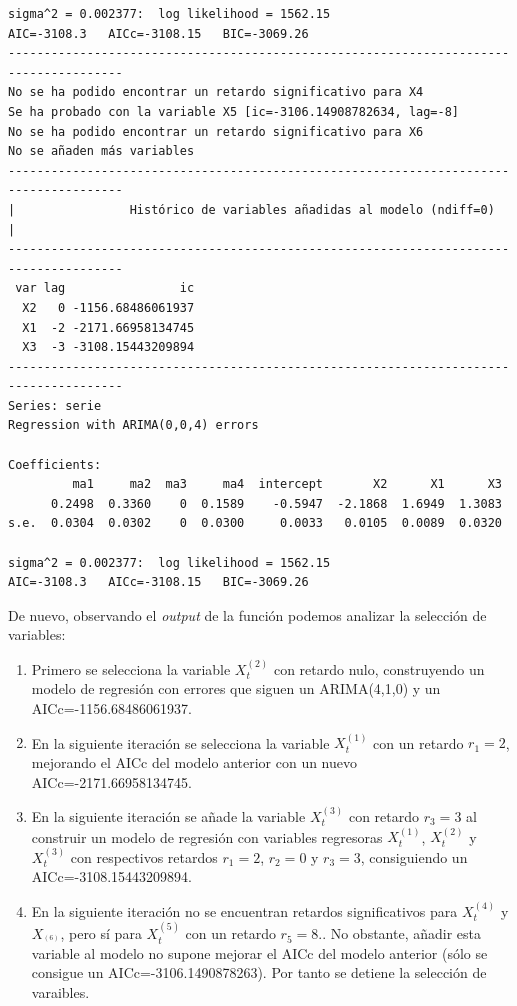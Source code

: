 \documentclass[
  12pt,
  a4paper]{article}
\providecommand{\tightlist}{%
  \setlength{\itemsep}{0pt}\setlength{\parskip}{0pt}}
\begin{document}
\begin{verbatim}
sigma^2 = 0.002377:  log likelihood = 1562.15
AIC=-3108.3   AICc=-3108.15   BIC=-3069.26
--------------------------------------------------------------------------------------
No se ha podido encontrar un retardo significativo para X4
Se ha probado con la variable X5 [ic=-3106.14908782634, lag=-8]
No se ha podido encontrar un retardo significativo para X6
No se añaden más variables
--------------------------------------------------------------------------------------
|                Histórico de variables añadidas al modelo (ndiff=0)                 |
--------------------------------------------------------------------------------------
 var lag                ic
  X2   0 -1156.68486061937
  X1  -2 -2171.66958134745
  X3  -3 -3108.15443209894
--------------------------------------------------------------------------------------
Series: serie 
Regression with ARIMA(0,0,4) errors 

Coefficients:
         ma1     ma2  ma3     ma4  intercept       X2      X1      X3
      0.2498  0.3360    0  0.1589    -0.5947  -2.1868  1.6949  1.3083
s.e.  0.0304  0.0302    0  0.0300     0.0033   0.0105  0.0089  0.0320

sigma^2 = 0.002377:  log likelihood = 1562.15
AIC=-3108.3   AICc=-3108.15   BIC=-3069.26
\end{verbatim}

De nuevo, observando el \emph{output} de la función podemos analizar la
selección de variables:

\begin{enumerate}
\def\labelenumi{\arabic{enumi}.}
\tightlist
\item
  Primero se selecciona la variable \(X_t^{(2)}\) con retardo nulo,
  construyendo un modelo de regresión con errores que siguen un
  ARIMA(4,1,0) y un AICc=-1156.68486061937.
\item
  En la siguiente iteración se selecciona la variable \(X_t^{(1)}\) con
  un retardo \(r_1=2\), mejorando el AICc del modelo anterior con un
  nuevo AICc=-2171.66958134745.
\item
  En la siguiente iteración se añade la variable \(X_t^{(3)}\) con
  retardo \(r_3=3\) al construir un modelo de regresión con variables
  regresoras \(X_t^{(1)}\), \(X_t^{(2)}\) y \(X_t^{(3)}\) con
  respectivos retardos \(r_1=2\), \(r_2=0\) y \(r_3=3\), consiguiendo un
  AICc=-3108.15443209894.
\item
  En la siguiente iteración no se encuentran retardos significativos
  para \(X_t^{(4)}\) y \(X_^{(6)}\), pero sí para \(X_t^{(5)}\) con un
  retardo \(r_5=8\).. No obstante, añadir esta variable al modelo no
  supone mejorar el AICc del modelo anterior (sólo se consigue un
  AICc=-3106.1490878263). Por tanto se detiene la selección de
  varaibles.
\end{enumerate}
\end{document}
